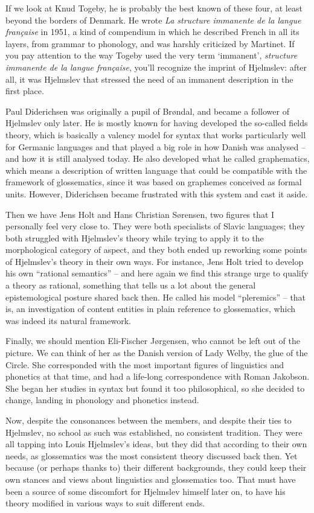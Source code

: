 If we look at Knud Togeby, he is probably the best known of these four, at least beyond the borders of Denmark. He wrote \textit{La structure immanente de la langue française} in 1951, a kind of compendium in which he described French in all its layers, from grammar to phonology, and was harshly criticized by Martinet. If you pay attention to the way Togeby used the very term ‘immanent’, \textit{structure immanente de la langue française}, you’ll recognize the imprint of Hjelmslev: after all, it was Hjelmslev that stressed the need of an immanent description in the first place.

Paul Diderichsen was originally a pupil of Brøndal, and became a follower of Hjelmslev only later. He is mostly known for having developed the so-called fields theory, which is basically a valency model for syntax that works particularly well for Germanic languages and that played a big role in how Danish was analysed – and how it is still analysed today. He also developed what he called graphematics, which means a description of written language that could be compatible with the framework of glossematics, since it was based on graphemes conceived as formal units. However, Diderichsen became frustrated with this system and cast it aside.

Then we have Jens Holt and Hans Christian Sørensen, two figures that I personally feel very close to. They were both specialists of Slavic languages; they both struggled with Hjelmslev’s theory while trying to apply it to the morphological category of aspect, and they both ended up reworking some points of Hjelmslev’s theory in their own ways. For instance, Jens Holt tried to develop his own “rational semantics” – and here again we find this strange urge to qualify a theory as rational, something that tells us a lot about the general epistemological posture shared back then. He called his model “pleremics” – that is, an investigation of content entities in plain reference to glossematics, which was indeed its natural framework. 

Finally, we should mention Eli-Fischer Jørgensen, who cannot be left out of the picture. We can think of her as the Danish version of Lady Welby, the glue of the Circle. She corresponded with the most important figures of linguistics and phonetics at that time, and had a life-long correspondence with Roman Jakobson. She began her studies in syntax but found it too philosophical, so she decided to change, landing in phonology and phonetics instead. 

Now, despite the consonances between the members, and despite their ties to Hjelmslev, no school as such was established, no consistent tradition. They were all tapping into Louis Hjelmslev’s ideas, but they did that according to their own needs, as glossematics was the most consistent theory discussed back then. Yet because (or perhaps thanks to) their different backgrounds, they could keep their own stances and views about linguistics and glossematics too. That must have been a source of some discomfort for Hjelmslev himself later on, to have his theory modified in various ways to suit different ends.

